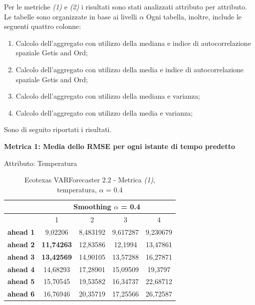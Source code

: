 \documentclass[12pt,a4paper,oneside,openright]{book}
\begin{document}
Per le metriche \textit{(1)} e \textit{(2)} i risultati sono stati analizzati attributo per attributo. Le tabelle sono organizzate in base ai livelli $\alpha$ Ogni tabella, inoltre, include le seguenti quattro colonne:

\begin{enumerate}
\item Calcolo dell'aggregato con utilizzo della mediana e indice di autocorrelazione spaziale Getis and Ord;
\item Calcolo dell'aggregato con utilizzo della media e indice di autocorrelazione spaziale Getis and Ord;
\item Calcolo dell'aggregato con utilizzo della mediana e varianza;
\item Calcolo dell'aggregato con utilizzo della media e varianza;
\end{enumerate}

Sono di seguito riportati i risultati.

\medskip

\textbf{Metrica 1: Media dello RMSE per ogni istante di tempo predetto} \medskip

Attributo: Temperatura \\ 

\begin{table}[H]
\centering
\begin{tabular}{|c|c|c|c|c|}
\hline
 & \multicolumn{4}{|c|}{Smoothing $\alpha$ = 0.4} \\
\hline
& 1 & 2 & 3 & 4 \\
\hline
\textbf{ahead 1} & 9,02206 & 8,483192 & 9,617287 & 9,230679\\
\hline
\textbf{ahead 2} & \textbf{11,74263} & 12,83586 & 12,1994 & 13,47861\\ 
\hline
\textbf{ahead 3} & \textbf{13,42569} & 14,90105 & 13,57288 & 16,27871\\
\hline
\textbf{ahead 4} & 14,68293 & 17,28901 & 15,09509 & 19,3797\\ 
\hline
\textbf{ahead 5} & 15,70545 & 19,53582 & 16,34737 & 22,68712\\
\hline
\textbf{ahead 6} & 16,76946 & 20,35719 & 17,25566 & 26,72587\\ 
\hline
\end{tabular} \\
\caption{Ecotexas VARForecaster 2.2 - Metrica \textit{(1)}, temperatura, $\alpha$ = 0.4}
\end{table} 

\newpage
\end{document}
